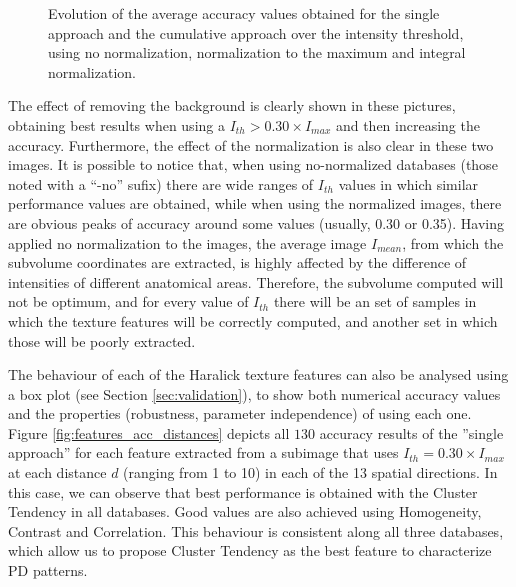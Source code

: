 \begin{figure}
	\caption[Evolution of the average accuracy with the intensity threshold.]{Evolution of the average accuracy values obtained for the single approach and the cumulative approach over the intensity threshold, using no normalization, normalization to the maximum and integral normalization.}
	\label{fig:featuresIth}
\end{figure}

The effect of removing the background is clearly shown in these pictures, obtaining best results when using a $I_{th}>0.30\times I_{max}$ and then increasing the accuracy. Furthermore, the effect of the normalization is also clear in these two images. It is possible to notice that, when using no-normalized databases (those noted with a ``-no'' sufix) there are wide ranges of $I_{th}$ values in which similar performance values are obtained, while when using the normalized images, there are obvious peaks of accuracy around some values (usually, 0.30 or 0.35). Having applied no normalization to the images, the average image $I_{mean}$, from which the subvolume coordinates are extracted, is highly affected by the difference of intensities of different anatomical areas. Therefore, the subvolume computed will not be optimum, and for every value of $I_{th}$ there will be an set of samples in which the texture features will be correctly computed, and another set in which those will be poorly extracted. 

The behaviour of each of the Haralick texture features can also be analysed using a box plot (see Section \ref{sec:validation}), to show both numerical accuracy values and the properties (robustness, parameter independence) of using each one. Figure \ref{fig:features_acc_distances} depicts all $130$ accuracy results of the ''single approach'' for each feature extracted from a subimage that uses $I_{th}=0.30\times I_{max}$ at each distance $d$ (ranging from 1 to 10) in each of the 13 spatial directions. In this case, we can observe that best performance is obtained with the Cluster Tendency in all databases. Good values are also achieved using Homogeneity, Contrast and Correlation. This behaviour is consistent along all three databases, which allow us to propose Cluster Tendency as the best feature to characterize PD patterns. 

